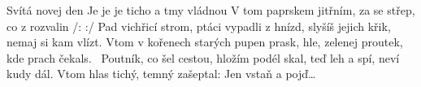 \begin{TEXT}{Svítá novej den}
\SLOKA* {}  
\SLOKA Je  je  \NL
je  ticho a tmy vládnou \NL
V tom paprskem jitřním, \NL
za se střep, co z rozvalin \NL
\REFREN  /:   :/
\SLOKA Pad vichřicí strom, ptáci vypadli z hnízd,\NL
slyšíš jejich křik, nemaj si kam vlízt.\NL
Vtom v kořenech starých pupen prask,\NL
hle, zelenej proutek, kde prach čekals.  
\REFREN \,
\SLOKA Poutník, co šel cestou, hložím podél skal,\NL
teď leh a spí, neví kudy dál.\NL
Vtom hlas tichý, temný zašeptal:\NL
Jen vstaň a pojď…   
\REFREN \,
\end{TEXT}
